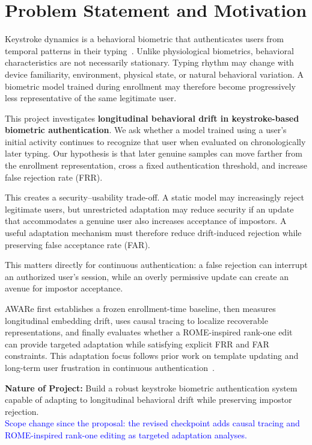 \documentclass[conference]{IEEEtran}
\begin{document}
\section{Problem Statement and Motivation}

Keystroke dynamics is a behavioral biometric that authenticates users from temporal patterns in their typing~\cite{subash,morales}. Unlike physiological biometrics, behavioral characteristics are not necessarily stationary. Typing rhythm may change with device familiarity, environment, physical state, or natural behavioral variation. A biometric model trained during enrollment may therefore become progressively less representative of the same legitimate user.

This project investigates \textbf{longitudinal behavioral drift in keystroke-based biometric authentication}. We ask whether a model trained using a user's initial activity continues to recognize that user when evaluated on chronologically later typing. Our hypothesis is that later genuine samples can move farther from the enrollment representation, cross a fixed authentication threshold, and increase false rejection rate (FRR).

This creates a security--usability trade-off. A static model may increasingly reject legitimate users, but unrestricted adaptation may reduce security if an update that accommodates a genuine user also increases acceptance of impostors. A useful adaptation mechanism must therefore reduce drift-induced rejection while preserving false acceptance rate (FAR).

This matters directly for continuous authentication: a false rejection can interrupt an authorized user's session, while an overly permissive update can create an avenue for impostor acceptance.

AWARe first establishes a frozen enrollment-time baseline, then measures longitudinal embedding drift, uses causal tracing to localize recoverable representations, and finally evaluates whether a ROME-inspired rank-one edit can provide targeted adaptation while satisfying explicit FRR and FAR constraints. This adaptation focus follows prior work on template updating and long-term user frustration in continuous authentication~\cite{mhenni,huh}.

\textbf{Nature of Project:} Build a robust keystroke biometric authentication system capable of adapting to longitudinal behavioral drift while preserving impostor rejection.\\
\textcolor{blue}{Scope change since the proposal: the revised checkpoint adds causal tracing and ROME-inspired rank-one editing as targeted adaptation analyses.}
\end{document}

